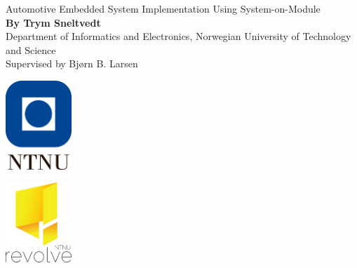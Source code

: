 \documentclass{article}
\begin{document}
\begin{minipage}[b]{0.80\linewidth}

{\color{headercolor}\Huge Automotive Embedded System Implementation Using System-on-Module}\\[.5cm] %
\LARGE \textbf{By Trym Sneltvedt}\\ %
\LARGE Department of Informatics and Electronics, Norwegian University of Technology and Science\\ %
\LARGE Supervised by Bjørn B. Larsen

\end{minipage}
%
\begin{minipage}[t]{0.10\linewidth}
\includegraphics[width=2.5cm]{media/ntnu_alt_versjon_uten_slagord.png}
\end{minipage}
%
\begin{minipage}[t]{0.10\linewidth}
\includegraphics[width=2.5cm]{media/revolve_standing.png}
\end{minipage}

\vspace{1cm}
\end{document}
